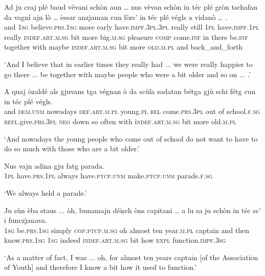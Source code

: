 \begin{linenumbers}
	\gll  Ad ju craj plé baud vèvani schòn aun … nus vèvan schòn in téc plé gròn tschafan da vagní ajn lò … èssar anzjaman cun fòrs’ in téc plé végls a vidanò … . \\
	and \textsc{1sg} believe.\textsc{prs.1sg} more early have.\textsc{impf.3pl.3pl} really still {} \textsc{1pl} have.\textsc{impf.1pl} really \textsc{indef.art.m.sg} bit more big.\textsc{m.sg} pleasure \textsc{comp} come.\textsc{inf} in there {} be.\textsc{inf} together with maybe \textsc{indef.art.m.sg} bit more \textsc{old.m.pl} and back\_and\_forth \\
\end{linenumbers}
\medskip
\glt `And I believe that in earlier times they really had ... we were really happier to go there ... be together with maybe people who were a bit older and so on ... .'
\medskip

\begin{linenumbers}
	\gll A quaj òzaldé als gjuvans tga végnan ò da scùla sadatan bétga gjù schi fétg cun in téc plé végls.   \\
	and \textsc{dem.unm} nowadays \textsc{def.art.m.pl} young.\textsc{pl} \textsc{rel} come.\textsc{prs.3pl} out of school.\textsc{f.sg} \textsc{refl}.give.\textsc{prs.3pl} \textsc{neg} down so often with i\textsc{ndef.art.m.sg} bit more old.\textsc{m.pl}\\
\end{linenumbers}
\medskip
\glt `And nowadays the young people who come out of school do not want to have to do so much with those who are a bit older.'
\medskip

\begin{linenumbers}
	\gll Nus vajn adina gju fatg parada.   \\
	\textsc{1pl} have.\textsc{prs.1pl} always have.\textsc{ptcp.unm} make.\textsc{ptcp.unm} parade.\textsc{f.sg}\\
\end{linenumbers}
\medskip
\glt `We always held a parade.'
\medskip

\begin{linenumbers}
	\gll Ju sùn èba staus ... òh, bunamajn déiṣch òns capitani … a lu sa ju schòn in téc sc’ i funczjanava.   \\
\textsc{1sg} be.\textsc{prs.1sg} simply \textsc{cop.ptcp.m.sg} {} oh almost ten year\textsc{.m.pl} captain {} and then know.\textsc{prs.1sg} \textsc{1sg} indeed \textsc{indef.art.m.sg} bit how \textsc{expl} function.\textsc{impf.3sg}\\
\end{linenumbers}
\medskip
\glt `As a matter of fact, I was ... oh, for almost ten years captain [of the Association of Youth] {} and therefore I know a bit how it used to function.'
\medskip

